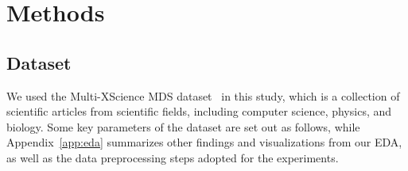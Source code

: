 \documentclass[12pt, twocolumn]{article}
\numberwithin{equation}{section}
\begin{document}
\section{Methods}
\label{sec:methods}

\subsection{Dataset}
\label{ssec:dataset}

We used the Multi-XScience MDS dataset~\cite{lu-etal-2020-multi-xscience} in this study, which is a collection of scientific articles from scientific fields, including computer science, physics, and biology.  Some key parameters of the dataset are set out as follows, while Appendix~\ref{app:eda} summarizes other findings and visualizations from our EDA, as well as the data preprocessing steps adopted for the experiments.  
\end{document}
